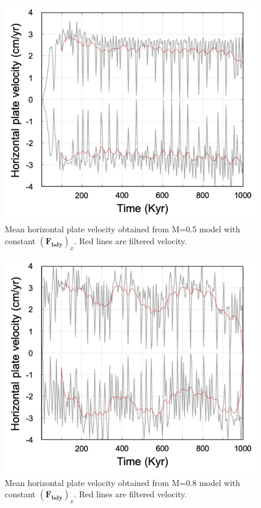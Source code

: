 \documentclass[letterpaper,12pt,notitle]{memphisthesis}                     %
\begin{document}

\begin{figure}[!htb]
	\centering
	\includegraphics[width=0.9\linewidth]{./figs/hmvfb05.png}
	\caption{Mean horizontal plate velocity obtained from M=0.5 model with constant $(\boldsymbol{F_{bdy}})_x$. Red lines are filtered velocity.}
	\label{fig:fbm05}
\end{figure}
\begin{figure}[!htb]
	\centering
	\includegraphics[width=0.9\linewidth]{./figs/hmvfb08.png}
	\caption{Mean horizontal plate velocity obtained from M=0.8 model with constant $(\boldsymbol{F_{bdy}})_x$. Red lines are filtered velocity.}
	\label{fig:fbm08}
\end{figure}
\end{document}
